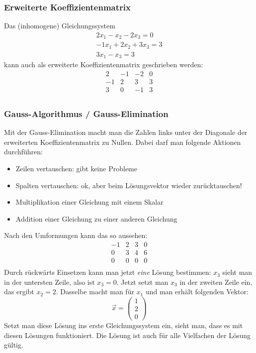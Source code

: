 \subsubsection{Erweiterte Koeffizientenmatrix}
Das (inhomogene) Gleichungssystem
\begin{align}
   2x_1 - x_2 - 2x_3 = 0 \\
   -1x_1 + 2x_2 + 3x_3 = 3 \\
   3x_1 - x_3 = 3
\end{align}
kann auch als erweiterte Koeffizientenmatrix geschrieben werden:
\[ \begin{array}{rrr|r}
2   &   -1    & -2    & 0   \\
-1  &   2     & 3     & 3   \\
3   &   0     & -1    & 3   \\
\end {array} \]

\subsubsection{Gauss-Algorithmus / Gauss-Elimination}
Mit der Gauss-Elimination macht man die Zahlen links unter der Diagonale
der erweiterten Koeffizientenmatrix zu Nullen. Dabei darf man folgende
Aktionen durchführen:
\begin{itemize}
  \item Zeilen vertauschen: gibt keine Probleme
  \item Spalten vertauschen: ok, aber beim Lösungsvektor wieder
    zurücktauschen!
  \item Multiplikation einer Gleichung mit einem Skalar
  \item Addition einer Gleichung zu einer anderen Gleichung
\end{itemize}
Nach den Umformungen kann das so aussehen:
\[ \begin{array}{rrr|r}
  -1 & 2  & 3  & 0 \\
  0 & 3  & 4  & 6 \\
  0 & 0  & 0  & 0 \\
\end {array} \]
Durch rückwärts Einsetzen kann man jetzt \emph{eine} Lösung bestimmen:
$x_3$ sieht man in der untersten Zeile, also ist $x_3 = 0$. Jetzt setzt
man $x_3$ in der zweiten Zeile ein, das ergibt $x_2 = 2$. Dasselbe macht
man für $x_1$ und man erhält folgenden Vektor:
\[ \vec x = \left( \begin{array} {c} 1 \\ 2 \\  0 \end{array} \right) \]
Setzt man diese Lösung ins erste Gleichungssystem ein, sieht man, dass
es mit diesen Lösungen funktioniert. Die Lösung ist auch für alle
Vielfachen der Lösung gültig.

